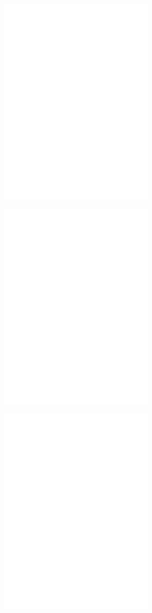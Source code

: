\begin{figure}
	\centering
	\includegraphics[width=3in]{figures/shapes/blank.png}
\end{figure}
\begin{figure}
	\centering
	\includegraphics[width=3in]{figures/shapes/blank.png}
\end{figure}
\begin{figure}
	\centering
	\includegraphics[width=3in]{figures/shapes/blank.png}
\end{figure}
